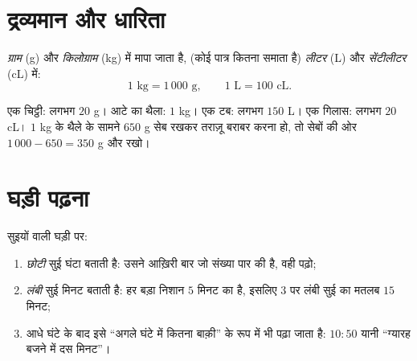 \section{द्रव्यमान और धारिता}

\begin{definition}[द्रव्यमान और धारिता के मात्रक]\label{def:g3:measure:mass}
 \emph{ग्राम} (g) और \emph{किलोग्राम} (kg) में मापा
जाता है,  (कोई पात्र कितना समाता है) \emph{लीटर} (L) और
\emph{सेंटीलीटर} (cL) में:
\[
1 \text{ kg} = 1\,000 \text{ g},
\qquad
1 \text{ L} = 100 \text{ cL}.
\]
\end{definition}

\begin{example}\label{ex:g3:measure:mass}
एक चिट्ठी: लगभग $20$ g। आटे का थैला: $1$ kg। एक टब: लगभग
$150$ L। एक गिलास: लगभग $20$ cL। $1$ kg के थैले के सामने
$650$ g सेब रखकर तराज़ू बराबर करना हो, तो सेबों की ओर
$1\,000 - 650 = 350$ g और रखो।
\end{example}

\section{घड़ी पढ़ना}

\begin{method}[समय पढ़ना]\label{met:g3:measure:clock}
सुइयों वाली घड़ी पर:
\begin{enumerate}
  \item \emph{छोटी} सुई घंटा बताती है: उसने आख़िरी बार जो
        संख्या पार की है, वही पढ़ो;
  \item \emph{लंबी} सुई मिनट बताती है: हर बड़ा निशान $5$
        मिनट का है, इसलिए $3$ पर लंबी सुई का मतलब $15$ मिनट;
  \item आधे घंटे के बाद इसे ``अगले घंटे में कितना बाक़ी'' के रूप
        में भी पढ़ा जाता है: $10{:}50$ यानी ``ग्यारह बजने में दस मिनट''।
\end{enumerate}
\end{method}


